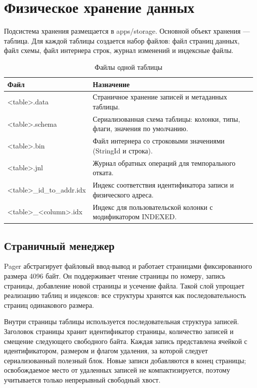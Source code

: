 \documentclass[a4paper,14pt]{extarticle}
\renewcommand{\texttt}[1]{\textrm{#1}}
\newcommand{\breaktt}[1]{\texttt{\footnotesize #1}}
\begin{document}
\section{Физическое хранение данных}

Подсистема хранения размещается в \texttt{apps/storage}. Основной объект хранения — таблица. Для каждой таблицы создается набор файлов: файл страниц данных, файл схемы, файл интернера строк, журнал изменений и индексные файлы.

\begin{table}[H]
\caption{Файлы одной таблицы}
\centering
\small
\begin{tabularx}{\textwidth}{>{\raggedright\arraybackslash}p{}Y}
\toprule
Файл & Назначение \\
\midrule
\breaktt{<table>.data} & Страничное хранение записей и метаданных таблицы. \\
\breaktt{<table>.schema} & Сериализованная схема таблицы: колонки, типы, флаги, значения по умолчанию. \\
\breaktt{<table>.bin} & Файл интернера со строковыми значениями (\texttt{StringId} и строка). \\
\breaktt{<table>.jnl} & Журнал обратных операций для темпорального отката. \\
\breaktt{<table>\_id\_to\_addr.idx} & Индекс соответствия идентификатора записи и физического адреса. \\
\breaktt{<table>\_<column>.idx} & Индекс для пользовательской колонки с модификатором \texttt{INDEXED}. \\
\bottomrule
\end{tabularx}
\end{table}

\subsection{Страничный менеджер}

Pager абстрагирует файловый ввод-вывод и работает страницами фиксированного размера 4096 байт. Он поддерживает чтение страницы по номеру, запись страницы, добавление новой страницы и усечение файла. Такой слой упрощает реализацию таблиц и индексов: все структуры хранятся как последовательность страниц одинакового размера.

Внутри страницы таблицы используется последовательная структура записей. Заголовок страницы хранит идентификатор страницы, количество записей и смещение следующего свободного байта. Каждая запись представлена ячейкой с идентификатором, размером и флагом удаления, за которой следует сериализованный полезный блок. Новые записи добавляются в конец страницы; освобождаемое место от удаленных записей не компактизируется, поэтому учитывается только непрерывный свободный хвост.
\end{document}
